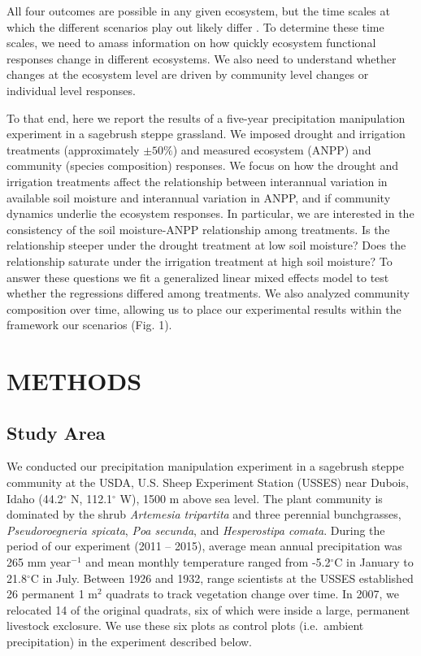 \documentclass[fleqn,10pt,lineno]{wlpeerj} %
\begin{document}
All four outcomes are possible in any given ecosystem, but the time
scales at which the different scenarios play out likely differ
\citep{Smith2009, Wilcox2016, Knapp2017}. To determine these time
scales, we need to amass information on how quickly ecosystem functional
responses change in different ecosystems. We also need to understand
whether changes at the ecosystem level are driven by community level
changes or individual level responses.

To that end, here we report the results of a five-year precipitation
manipulation experiment in a sagebrush steppe grassland. We imposed
drought and irrigation treatments (approximately \(\pm50\%\)) and
measured ecosystem (ANPP) and community (species composition) responses.
We focus on how the drought and irrigation treatments affect the
relationship between interannual variation in available soil moisture
and interannual variation in ANPP, and if community dynamics underlie
the ecosystem responses. In particular, we are interested in the
consistency of the soil moisture-ANPP relationship among treatments. Is
the relationship steeper under the drought treatment at low soil
moisture? Does the relationship saturate under the irrigation treatment
at high soil moisture? To answer these questions we fit a generalized
linear mixed effects model to test whether the regressions differed
among treatments. We also analyzed community composition over time,
allowing us to place our experimental results within the framework our
scenarios (Fig. 1).

\section{METHODS}\label{methods}

\subsection{Study Area}\label{study-area}

We conducted our precipitation manipulation experiment in a sagebrush
steppe community at the USDA, U.S. Sheep Experiment Station (USSES) near
Dubois, Idaho (44.2\(^{\circ}\) N, 112.1\(^{\circ}\) W), 1500 m above
sea level. The plant community is dominated by the shrub
\emph{Artemesia tripartita} and three perennial bunchgrasses,
\emph{Pseudoroegneria spicata}, \emph{Poa secunda}, and
\emph{Hesperostipa comata}. During the period of our experiment (2011 --
2015), average mean annual precipitation was 265 mm
year\(\phantom{}^{-1}\) and mean monthly temperature ranged from
-5.2\(^{\circ}\)C in January to 21.8\(^{\circ}\)C in July. Between 1926
and 1932, range scientists at the USSES established 26 permanent 1
m\(^2\) quadrats to track vegetation change over time. In 2007, we
relocated 14 of the original quadrats, six of which were inside a large,
permanent livestock exclosure. We use these six plots as control plots
(i.e.~ambient precipitation) in the experiment described below.
\end{document}
